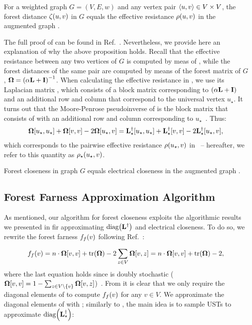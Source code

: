 \begin{proposition}
\label{prop:el-clos:forest-effres}
For a weighted graph $G = (V, E, w)$ and any vertex pair
$\pair{u}{v} \in V\times V$, the forest distance $\zeta(u, v)$
in $G$ equals the effective resistance $\rho(u, v)$ in the augmented
graph \gstar.
\end{proposition}

The full proof of  can be found
in Ref.~\cite{chebotarev2000forest}. Nevertheless, we provide here an explanation
of why the above proposition holds.
Recall that the effective resistance between any two vertices of $G$ is
computed by meas of \change{\Linv}, while the forest distances of the same pair
are computed by means of the forest matrix of $G$, \ie
$\Fmat = \roundb{\alpha\Lapl + \Ident}^{-1}$.
When calculating the effective resistance in \gstar, we use its
Laplacian matrix \Lstar, which consists of a block matrix corresponding
to $(\alpha\mathbf{L} + \mathbf{I})$ and an additional row and column that
correspond to the universal vertex $u_\star$. It turns out that
the Moore-Penrose pseudoinverse of \Lstar is the block matrix
that consists of \Fmat with an additional row and column corresponding
to $u_\star$~\cite{chebotarev2000forest}. Thus:
%
\[
    \bm{\Omega}[u_\star, u_\star] + \bm{\Omega}[v, v] - 2\bm{\Omega}[u_\star, v] =
    \mathbf{L}^\dagger_\star[u_\star, u_\star] + \mathbf{L}^\dagger_\star[v, v] - 2\mathbf{L}^\dagger_\star[u_\star, v],
\]
%
which corresponds to the pairwise effective resistance
$\rho(u_\star, v)$ in \gstar\ -- hereafter, we refer to this quantity
as $\rho_{\star}(u_\star, v)$.

\begin{corollary}
Forest closeness in graph $G$ equals electrical closeness
in the augmented graph \gstar.
\end{corollary}

\subsection{Forest Farness Approximation Algorithm}



As mentioned, our algorithm for forest closeness exploits
the algorithmic results we presented in 
fir approximating $\diag{\Linv}$ and electrical closeness.
To do so, we rewrite the forest farness $f_f(v)$ following
Ref.~\cite{merris1997doubly}:

\begin{equation}
\label{eq:el-clos:forest-farness}
\ffarn(v) = n\cdot\Fmat[v, v] + \tr{\Fmat} - 2\sum_{z\in V}\Fmat[v, z] =
n\cdot\Fmat[v, v] + \tr{\Fmat} - 2,
\end{equation}
%
where the last equation holds since \Fmat is doubly stochastic
($\Fmat[v, v] = 1 - \sum_{z\in V \setminus\set{v}}\Fmat[v, z]$)~\cite{merris1997doubly}.
From  it is clear that we only require
the diagonal elements of \Fmat to compute $f_f(v)$ for any $v\in V$.
We approximate the diagonal elements of \Fmat with ;
similarly to , the main idea is to sample USTs to
approximate $\diag{\Linvstar}$:

